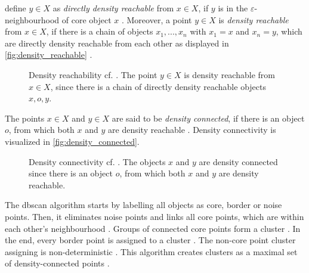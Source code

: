 \citeauthor{OPTICS_kMeans_2016} define $y \in X$ as \textit{directly density reachable} from $x \in X$, if $y$ is in the $\varepsilon$-neighbourhood of core object $x$ \cite{OPTICS_kMeans_2016}.
Moreover, a point $y \in X$ is \textit{density reachable} from $x \in X$, if there is a chain of objects $x_1, ..., x_n$ with $x_1 = x$ and $x_n = y$, 
which are directly density reachable from each other as displayed in \autoref{fig:density_reachable} \cite{OPTICS_kMeans_2016}.

\begin{figure}[htp] %
    \centering
    
    \caption[Density reachability]{Density reachability cf. \cite{OPTICS1999}.
    The point $y \in X$ is density reachable from $x \in X$, since there is a chain of directly density reachable objects $x, o, y$.
    }
    \label{fig:density_reachable}
\end{figure}

The points $x \in X$ and $y \in X$ are said to be \textit{density connected}, if there is an object $o$, from which both $x$ and $y$ are density reachable \cite{OPTICS_kMeans_2016}.
Density connectivity is visualized in \autoref{fig:density_connected}.

\begin{figure}[htp] %
    \centering
    
    \caption[Density connectivity]{Density connectivity cf. \cite{OPTICS1999}.
    The objects $x$ and $y$ are density connected since there is an object $o$, from which both $x$ and $y$ are density reachable.
    }
    \label{fig:density_connected}
\end{figure}

The \ac{dbscan} algorithm starts by labelling all objects as core, border or noise points.
Then, it eliminates noise points and links all core points, which are within each other's neighbourhood \cite{OPTICS_kMeans_2016}.
Groups of connected core points form a cluster \cite{OPTICS_kMeans_2016}.
In the end, every border point is assigned to a cluster \cite{OPTICS_kMeans_2016}.
The non-core point cluster assigning is non-deterministic \cite{OPTICS2013}.
This algorithm creates clusters as a maximal set of density-connected points \cite{OPTICS_kMeans_2016}.


